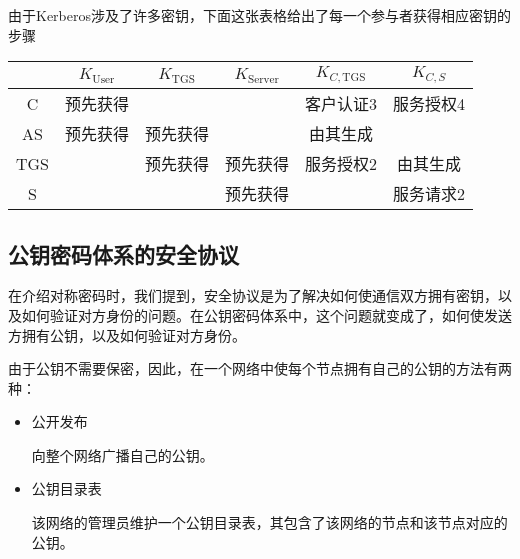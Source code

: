 由于Kerberos涉及了许多密钥，下面这张表格给出了每一个参与者获得相应密钥的步骤
\begin{table}[H]
\centering
\begin{tabular}{c|c|c|c|c|c}\hline
&$K_{\mathrm{User}}$&$K_{\mathrm{TGS}}$&$K_{\mathrm{Server}}$&$K_{C, \mathrm{TGS}}$&$K_{C, S}$\\\hline
C&预先获得&&&客户认证3&服务授权4\\\hline
AS&预先获得&预先获得&&由其生成&\\\hline
TGS&&预先获得&预先获得&服务授权2&由其生成\\\hline
S&&&预先获得&&服务请求2\\\hline
\end{tabular}
\end{table}
\subsection{公钥密码体系的安全协议}
在介绍对称密码时，我们提到，安全协议是为了解决如何使通信双方拥有密钥，以及如何验证对方身份的问题。在公钥密码体系中，这个问题就变成了，如何使发送方拥有公钥，以及如何验证对方身份。\par
由于公钥不需要保密，因此，在一个网络中使每个节点拥有自己的公钥的方法有两种：
\begin{itemize}
    \item 公开发布\par
    向整个网络广播自己的公钥。
    \item 公钥目录表\par
    该网络的管理员维护一个公钥目录表，其包含了该网络的节点和该节点对应的公钥。
\end{itemize}

